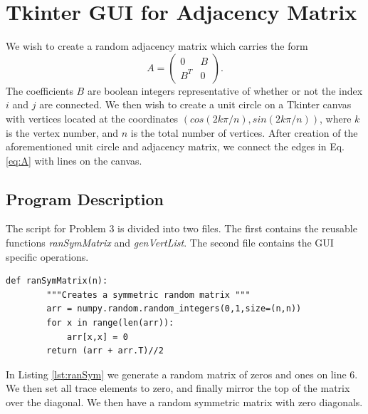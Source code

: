 \section{Tkinter GUI for Adjacency Matrix} %
\label{sec:tkinter_gui_for_adjacency_matrix}
We wish to create a random adjacency matrix which carries the form
\begin{equation} \label{eq:A}
    A = \begin{pmatrix} 0 & B \\ B^T & 0 \end{pmatrix}.
\end{equation}
The coefficients $B$ are boolean integers representative of whether or not the index $i$ and $j$ are connected. We then wish to create a unit circle on a Tkinter canvas with vertices located at the coordinates $(cos(2k\pi/n),sin(2k\pi/n))$, where $k$ is the vertex number, and $n$ is the total number of vertices. After creation of the aforementioned unit circle and adjacency matrix, we connect the edges in Eq. \ref{eq:A} with lines on the canvas.

\subsection{Program Description} %
\label{sub:program_description3}
The script for Problem 3 is divided into two files. The first contains the reusable functions \emph{ranSymMatrix} and \emph{genVertList}. The second file contains the GUI specific operations. 

\begin{lstlisting}[caption={Generation of a Random Adjacency Matrix}, label=lst:ranSym,firstnumber=4]
    def ranSymMatrix(n):
        """Creates a symmetric random matrix """
        arr = numpy.random.random_integers(0,1,size=(n,n))
        for x in range(len(arr)):
            arr[x,x] = 0
        return (arr + arr.T)//2
\end{lstlisting}\noindent
In Listing \ref{lst:ranSym} we generate a random matrix of zeros and ones on line 6. We then set all trace elements to zero, and finally mirror the top of the matrix over the diagonal. We then have a random symmetric matrix with zero diagonals.

